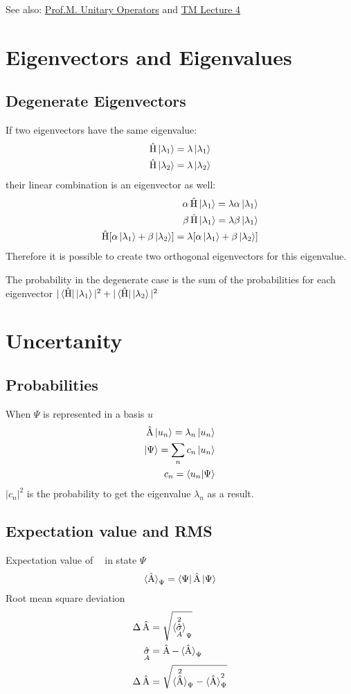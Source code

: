 \documentclass[10pt,a4paper]{book}
\DeclareMathOperator {\opH} {\hat{H}}
\DeclareMathOperator {\opA} {\hat{A}}
\DeclareMathOperator {\opSigma} {\hat{\sigma}}
\begin{document}
See also: \href{https://www.youtube.com/watch?v=baIT6HaaYuQ}{Prof.M. Unitary Operators} and \href{https://www.youtube.com/watch?v=tRWBoossG0Y&list=PL701CD168D02FF56F&index=9}{TM Lecture 4}

\chapter{Eigenvectors and Eigenvalues}
\section{Degenerate Eigenvectors}
If two eigenvectors have the same eigenvalue:
\begin{align}
	\opH\ket{\lambda_1} = \lambda \ket{\lambda_1} \\
	\opH\ket{\lambda_2} = \lambda \ket{\lambda_2}
\end{align}
their linear combination is an eigenvector as well:
\begin{align}
	\alpha \opH\ket{\lambda_1} = \lambda \alpha \ket{\lambda_1} \\
	\beta \opH\ket{\lambda_1} = \lambda \beta \ket{\lambda_1}   \\
	\opH[\alpha \ket{\lambda_1} + \beta \ket{\lambda_2}] = \lambda [\alpha \ket{\lambda_1} + \beta \ket{\lambda_2}]
\end{align}
Therefore it is possible to create two orthogonal eigenvectors for this eigenvalue.

The probability in the degenerate case is the sum of the probabilities for each eigenvector $| \bra{\opH} \ket{\lambda_1}|^2 + | \bra{\opH} \ket{\lambda_2}|^2$

\chapter{Uncertanity}
\section{Probabilities}
When $\Psi$ is represented in a basis $u$
\begin{align}
	\opA\ket{u_n} = \lambda_n\ket{u_n}\\
	\ket{\Psi} = \sum_{n}c_n\ket{u_n} \\
	c_n = \braket{u_n|\Psi}
\end{align}
$|c_n|^2$ is the probability to get the eigenvalue $\lambda_n$ as a result.
\section{Expectation value and RMS}
Expectation value of $\opA$ in state $\Psi$
\begin{align}
	\braket{\opA}_\Psi = \bra{\Psi}\opA\ket{\Psi}
\end{align}
Root mean square deviation
\begin{align}
	\Delta \opA &= \sqrt{\braket{\opSigma_A^2}_\Psi}\\
	\opSigma_A &= \opA - \braket{\opA}_\Psi \\
	\Delta \opA &= \sqrt{\braket{\opA^2}_\Psi - \braket{\opA}_\Psi^2}
\end{align}
\end{document}
